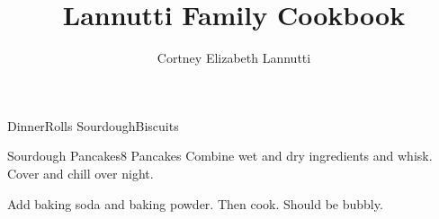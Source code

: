 \documentclass[a4paper]{article}
\title{Lannutti Family Cookbook}
\author{Cortney Elizabeth Lannutti}
\date{}
\begin{document}
\maketitle

{DinnerRolls}
{SourdoughBiscuits}

\begin{recipe}{Sourdough Pancakes}{8 Pancakes}{}
    Combine wet and dry ingredients and whisk. Cover and chill over night.

    Add baking soda and baking powder. Then cook. Should be bubbly.
\end{recipe}
\end{document}

